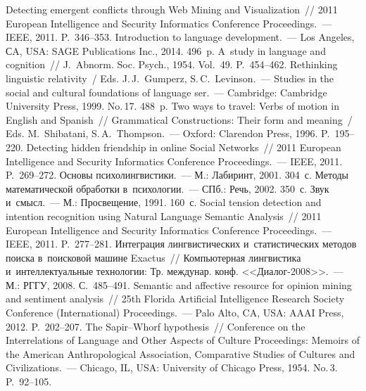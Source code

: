 \begin{multicols}{2}
{\small\frenchspacing
 {%
 \begin{thebibliography}{99}
 Detecting emergent conflicts through Web Mining and Visualization~// 
2011 European Intelligence and Security Informatics Conference 
Proceedings.~--- IEEE, 2011. P.~346--353.
 Introduction to language development.~--- Los Angeles, СA, USA: 
SAGE Publications Inc., 2014. 496~p.
 A~study in language and cognition~// J.~Abnorm. 
Soc. Psych., 1954. Vol.~49. P.~454--462.
Rethinking linguistic relativity~/ Eds. J.\,J.~Gumperz, S.\,C.~Levinson.~--- 
Studies in the social and cultural foundations of language ser.~--- 
Cambridge: Cambridge University Press, 1999.  No.\,17. 488~p. 
 Two ways to travel: Verbs of motion in English and Spanish~// 
Grammatical Constructions: Their form and meaning~/ Eds. M.~Shibatani, 
S.\,A.~Thompson.~--- Oxford: Clarendon Press, 1996. P.~195--220.
 Detecting hidden friendship in online Social Networks~// 2011 
European Intelligence and Security Informatics Conference  
Proceedings.~--- IEEE, 2011. P.~269--272.
 Основы психолингвистики.~--- М.: Лабиринт, 
2001. 304~с.
 Методы математической обработки в~психологии.~--- 
СПб.: Речь, 2002. 350~с.
 Звук и~смысл.~--- М.: Просвещение, 1991. 160~с.
 Social tension detection and intention 
recognition using Natural Language Semantic Analysis~// 2011 European 
Intelligence and Security Informatics Conference Proceedings.~--- 
IEEE, 2011. P.~277--281.
 Интеграция лингвистических 
и~статистических методов поиска в~поисковой машине Exactus~// 
Компьютерная лингвистика и~интеллектуальные технологии: Тр. междунар. 
конф. <<Диалог-2008>>.~--- М.: РГГУ, 2008. С.~485--491.
 Semantic and affective resource for 
opinion mining and sentiment analysis~// 25th  Florida Artificial 
Intelligence Research Society Conference (International) Proceedings.~--- Palo 
Alto, CA, USA: AAAI Press, 2012. P.~202--207.
 The Sapir--Whorf hypothesis~// Conference on the Interrelations of 
Language and Other Aspects of Culture Proceedings: Memoirs of the American 
Anthropological Association, Comparative Studies of Cultures and Civilizations.~--- 
Chicago, IL, USA: University of Chicago Press, 1954. No.\,3. P.~92--105.
 \end{thebibliography}

 }
 }

\end{multicols}

